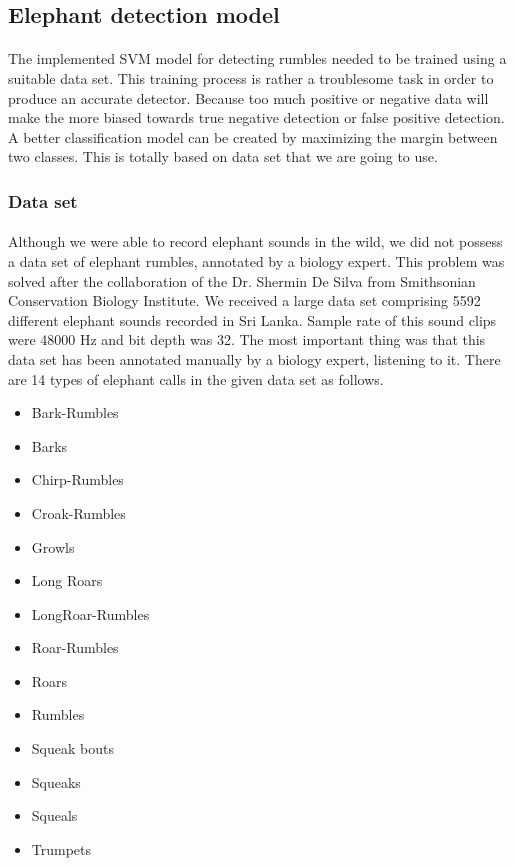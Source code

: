 \documentclass[12pt]{article}
\numberwithin{figure}{section}
\numberwithin{table}{section}
\begin{document}
\newpage


\subsection{Elephant detection model}
\paragraph{}
The implemented SVM model for detecting rumbles needed to be trained using a suitable data set. This training process is rather a troublesome task in order to produce an accurate detector. Because too much positive or negative data will make the more biased towards true negative detection or false positive detection. A better classification model can be created by maximizing the  margin between two classes. This is totally based on data set that we are going to use.

\subsubsection{Data set}
\paragraph{}
Although we were able to record elephant sounds in the wild, we did not possess a data set of elephant rumbles, annotated by a biology expert. This problem was solved after the collaboration of the Dr. Shermin De Silva from Smithsonian Conservation Biology Institute. We received a large data set comprising 5592 different elephant sounds recorded in Sri Lanka. Sample rate of this sound clips were 48000 Hz and bit depth was 32. The most important thing was that this data set has been annotated manually by a biology expert, listening to it. There are 14 types of elephant calls in the given data set as follows.
\begin{itemize}
  \item Bark-Rumbles
  \item Barks
  \item Chirp-Rumbles
  \item Croak-Rumbles
  \item Growls
  \item Long Roars
  \item LongRoar-Rumbles
  \item Roar-Rumbles
  \item Roars
  \item Rumbles
  \item Squeak bouts
  \item Squeaks
  \item Squeals
  \item Trumpets
\end{itemize}
\end{document}
